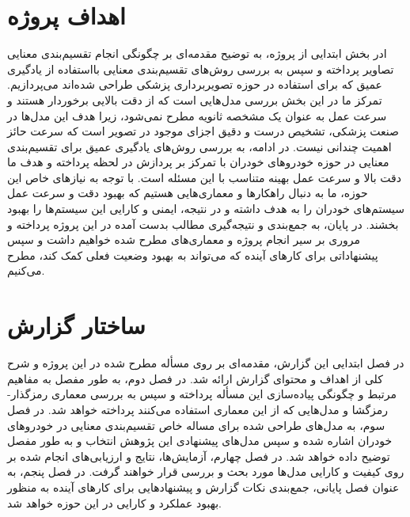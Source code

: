 \section{اهداف پروژه}
ادر بخش ابتدایی از پروژه، به توضیح مقدمه‌ای بر چگونگی انجام تقسیم‌بندی معنایی تصاویر پرداخته و سپس به بررسی روش‌های تقسیم‌بندی معنایی بااستفاده از یادگیری عمیق که برای استفاده در حوزه تصویربرداری پزشکی طراحی شده‌اند
می‌پردازیم. تمرکز ما در این بخش بررسی مدل‌هایی است که از دقت بالایی برخوردار هستند و سرعت عمل به عنوان یک مشخصه ثانویه مطرح نمی‌شود، زیرا هدف این مدل‌ها در صنعت پزشکی، تشخیص درست و دقیق اجزای موجود در تصویر است که سرعت حائز اهمیت چندانی نیست.
در ادامه، به بررسی روش‌های یادگیری عمیق برای تقسیم‌بندی معنایی در حوزه خودروهای خودران با تمرکز بر پردازش در لحظه پرداخته و هدف ما دقت بالا و سرعت عمل بهینه متناسب با این مسئله است. با توجه به نیازهای خاص این حوزه، ما به دنبال راهکارها و معماری‌هایی هستیم که بهبود دقت و سرعت عمل سیستم‌های خودران را به هدف داشته و در نتیجه، ایمنی و کارایی این سیستم‌ها را بهبود بخشند.
در پایان، به جمع‌بندی و نتیجه‌گیری مطالب بدست آمده در این پروژه پرداخته و مروری بر سیر انجام پروژه و معماری‌های مطرح شده خواهیم داشت و سپس پیشنهاداتی برای کار‌های آینده که می‌تواند به بهبود وضعیت فعلی کمک کند، مطرح می‌کنیم.

\section{ساختار گزارش}
در فصل ابتدایی این گزارش، مقدمه‌ای بر روی مسأله مطرح شده در این پروژه و شرح کلی از اهداف و محتوای گزارش ارائه شد. در فصل دوم، به طور مفصل به مفاهیم مرتبط و چگونگی پیاده‌سازی این مسأله پرداخته و سپس به بررسی معماری رمزگذار-رمزگشا و مدل‌هایی که از این معماری استفاده می‌کنند پرداخته خواهد شد. در فصل سوم، به مدل‌های طراحی شده برای مساله خاص تقسیم‌بندی معنایی در خودروهای خودران اشاره شده و سپس مدل‌های پیشنهادی این پژوهش انتخاب و به طور مفصل توضیح داده خواهد شد. در فصل چهارم، آزمایش‌ها، نتایج و ارزیابی‌های انجام شده بر روی کیفیت و کارایی مدل‌ها مورد بحث و بررسی قرار خواهند گرفت. در فصل پنجم، به عنوان فصل پایانی، جمع‌بندی نکات گزارش و پیشنهاد‌هایی برای کارهای آینده به منظور بهبود عملکرد و کارایی در این حوزه خواهد شد.